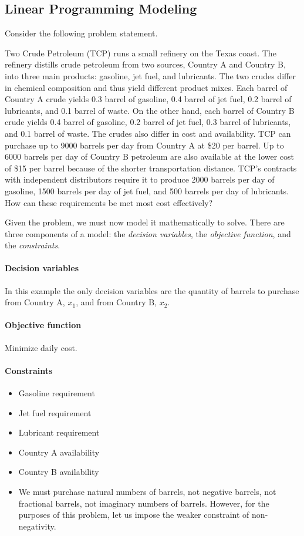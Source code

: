 \subsection{Linear Programming Modeling}

Consider the following problem statement. 

Two Crude Petroleum (TCP) runs a small refinery on the Texas coast.
The refinery distills crude petroleum from two sources, Country A and
Country B, into three main products: gasoline, jet fuel, and lubricants.
The two crudes differ in chemical composition and thus yield different
product mixes. Each barrel of Country A crude yields 0.3 barrel of
gasoline, 0.4 barrel of jet fuel, 0.2 barrel of lubricants, and 0.1 barrel of
waste. On the other hand, each barrel of Country B crude yields 0.4
barrel of gasoline, 0.2 barrel of jet fuel, 0.3 barrel of lubricants, and 0.1
barrel of waste. The crudes also differ in cost and availability. TCP can
purchase up to 9000 barrels per day from Country A at \$20 per barrel.
Up to 6000 barrels per day of Country B petroleum are also available
at the lower cost of \$15 per barrel because of the shorter
transportation distance. TCP's contracts with independent distributors
require it to produce 2000 barrels per day of gasoline, 1500 barrels per
day of jet fuel, and 500 barrels per day of lubricants. How can these
requirements be met most cost effectively?

Given the problem, we must now model it mathematically to solve. There 
are three components of a model: the \emph{decision variables}, the 
\emph{objective function}, and the \emph{constraints}. 

\paragraph{Decision variables}
In this example the only decision variables are the quantity of 
barrels to purchase from Country A, $x_1$, and from Country B, $x_2$. 

\paragraph{Objective function}
Minimize daily cost. 

\paragraph{Constraints}
\begin{itemize}
    \item Gasoline requirement
    \item Jet fuel requirement
    \item Lubricant requirement
    \item Country A availability
    \item Country B availability
    \item We must purchase natural numbers of barrels, not negative barrels, not fractional barrels, not imaginary numbers of barrels. 
    However, for the purposes of this problem, let us impose the weaker constraint of non-negativity.
\end{itemize}

